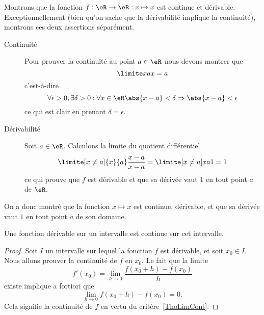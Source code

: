 \begin{example}
      Montrons que la fonction $f : \eR \to \eR : x\mapsto x$ est continue et dérivable. Exceptionnellement (bien qu'on sache que la dérivabilité implique la continuité), montrons ces deux assertions séparément.
      \begin{description}
      \item[Continuité] Pour prouver la continuité au point $a \in \eR$ nous devons montrer que
     \begin{equation}
       \limite x a x = a
     \end{equation}
     c'est-à-dire
     \begin{equation}
       \forall \epsilon > 0, \exists \delta > 0 :  \forall x \in \eR \abs{x-a} <
       \delta \Rightarrow \abs{x-a} < \epsilon
     \end{equation}
     ce qui est clair en prenant $\delta = \epsilon$.

      \item[Dérivabilité] Soit $a \in \eR$. Calculons la limite du quotient différentiel
        \begin{equation}
          \limite[x\neq a]{x}{a} \frac{x-a}{x-a} = \limite[x\neq a]x a 1 = 1
        \end{equation}
        ce qui prouve que $f$ est dérivable et que sa dérivée vaut $1$ en
        tout point $a$ de $\eR$.
      \end{description}

     On a donc montré que la fonction $x \mapsto x$ est continue, dérivable, et que sa dérivée vaut $1$ en tout point $a$ de son domaine.

\end{example}

\begin{proposition} \label{PropSFyxOWF}
    Une fonction dérivable sur un intervalle est continue sur cet intervalle.
\end{proposition}

\begin{proof}
    Soit \( I\) un intervalle sur lequel la fonction \( f\) est dérivable, et soit \( x_0\in I\). Nous allons prouver la continuité de \( f\) en \( x_0\). Le fait que la limite
    \begin{equation}
        f'(x_0)=\lim_{h\to 0} \frac{ f(x_0+h)-f(x_0) }{ h }
    \end{equation}
    existe implique a fortiori que
    \begin{equation}
        \lim_{h\to 0} f(x_0+h)-f(x_0)=0.
    \end{equation}
    Cela signifie la continuité de \( f\) en vertu du critère~\ref{ThoLimCont}.
\end{proof}

